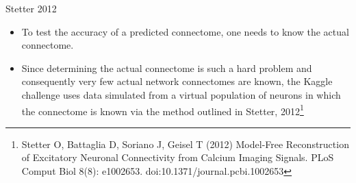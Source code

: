 \documentclass{beamer}
\begin{document}
\begin{frame}{Stetter 2012}
\begin{itemize}
\item To test the accuracy of a predicted connectome, one needs to know the actual connectome. 
\item Since determining the actual connectome is such a hard problem and consequently very few actual network connectomes are known, the Kaggle challenge uses data simulated from a virtual population of neurons in which the connectome is known via the method outlined in Stetter, 2012\footnote{Stetter O, Battaglia D, Soriano J, Geisel T (2012) Model-Free Reconstruction of Excitatory Neuronal Connectivity from Calcium Imaging Signals. PLoS Comput Biol 8(8): e1002653. doi:10.1371/journal.pcbi.1002653}

\end{itemize}


\end{frame}
\end{document}
